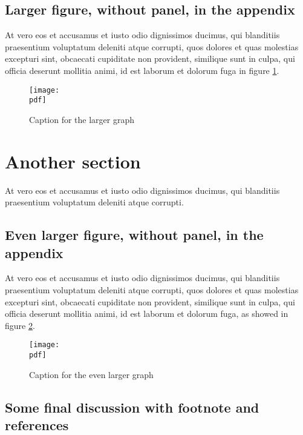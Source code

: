 \documentclass[letterpaper,12pt,leqno]{article}
\newcommand{\pdf}{figures.pdf}
\begin{document}
\subsection{Larger figure, without panel, in the appendix} 

At vero eos et accusamus et iusto odio dignissimos ducimus, qui blanditiis praesentium voluptatum deleniti atque corrupti, quos dolores et quas molestias excepturi sint, obcaecati cupiditate non provident, similique sunt in culpa, qui officia deserunt mollitia animi, id est laborum et dolorum fuga in figure \ref{f:appendix1}.

\begin{figure}[t]
\texttt{[image: \\pdf]}
\caption{Caption for the larger graph}
\label{f:appendix1}\end{figure}

\section{Another section}\label{a:appendix2}

At vero eos et accusamus et iusto odio dignissimos ducimus, qui blanditiis praesentium voluptatum deleniti atque corrupti.

\subsection{Even larger figure, without panel, in the appendix} 

At vero eos et accusamus et iusto odio dignissimos ducimus, qui blanditiis praesentium voluptatum deleniti atque corrupti, quos dolores et quas molestias excepturi sint, obcaecati cupiditate non provident, similique sunt in culpa, qui officia deserunt mollitia animi, id est laborum et dolorum fuga, as showed in figure \ref{f:appendix2}.

\begin{figure}[t]
\texttt{[image: \\pdf]}
\caption{Caption for the even larger graph}
\label{f:appendix2}\end{figure}


\subsection{Some final discussion with footnote and references}\label{a:subappendix}
\end{document}
